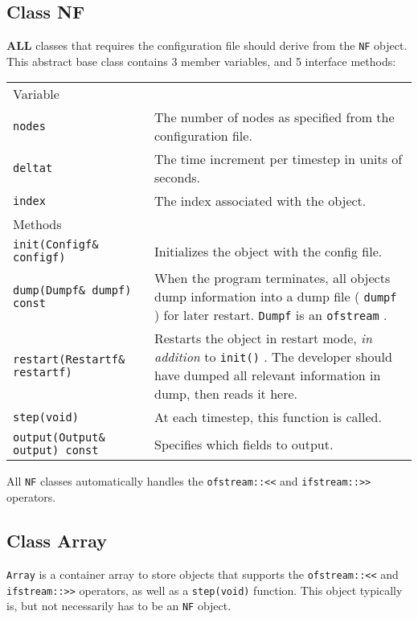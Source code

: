\documentclass[12pt,a4paper]{article}
\newcommand{\type}[1]{ {\small\small\tt #1} }
\begin{document}

\subsection{Class NF}
\label{sec:nf}

\textbf{ALL} classes that requires the configuration file should derive from the \type{NF} object. This abstract base class contains 3 member variables, and 5 interface methods:

\begin{tabular}{l p{10cm}}
Variable\\[6pt]
\type{nodes}&The number of nodes as specified from the configuration file.\\
\type{deltat}&The time increment per timestep in units of seconds.\\
\type{index}&The index associated with the object.\\[6pt]
Methods\\[6pt]
\type{init(Configf\& configf)}&Initializes the object with the config file.\\
 \type{dump(Dumpf\& dumpf) const}&When the program terminates, all objects dump information into a dump file (\type{dumpf}) for later restart. \type{Dumpf} is an \type{ofstream}.\\
\type{restart(Restartf\& restartf)}&Restarts the object in restart mode, \emph{in addition} to \type{init()}. The developer should have dumped all relevant information in dump, then reads it here.\\
\type{step(void)}&At each timestep, this function is called.\\
\type{output(Output\& output) const}&Specifies which fields to output.\\
\end{tabular}

All \type{NF} classes automatically handles the \type{ofstream::<<} and \type{ifstream::>>} operators.

\subsection{Class Array}
\label{sec:array}

\type{Array} is a container array to store objects that supports the \type{ofstream::<<} and \type{ifstream::>>} operators, as well as a \type{step(void)} function. This object typically is, but not necessarily has to be an \type{NF} object.
\end{document}
